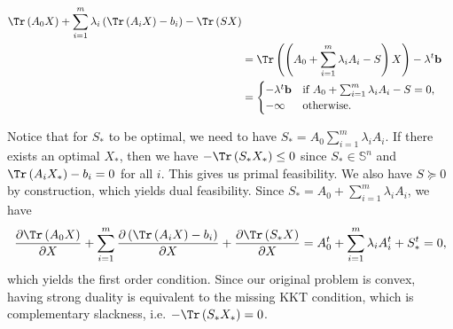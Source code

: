 \documentclass{article}
\begin{document}
\begin{itemize}
\begin{align*}
               \Tr\left(A_0X\right) +
               \sum_{i = 1}^{m}\lambda_{i}
               \left(\Tr\left(A_{i}X\right) - b_{i}\right) -
               \Tr\left(SX\right) \\
               &= \Tr\left(
               \left(
               A_0 + \sum_{i = 1}^{m} \lambda_{i}A_{i} -S
               \right)X
               \right)
               -\lambda^{t}\mathbf{b} \\
               &= 
               \begin{cases}
                   -\lambda^{t}\mathbf{b} &\text{if } 
                   A_0  + \sum_{i = 1}^{m}\lambda_{i}A_{i} - S = 0, \\
                   -\infty &\text{otherwise.}
               \end{cases}
           \end{align*}
           
           Notice that for $S_{*}$ to be optimal,
           we need to have $S_{*} = A_0 \sum_{i = 1}^{m} \lambda_{i}A_{i}$.
           If there exists an optimal $X_{*}$,
           then we have $-\Tr\left(S_{*}X_{*}\right) \leq 0$
           since $S_{*} \in \mathbb{S}^{n}$ and
           $\Tr\left(A_{i}X_{*}\right) - b_{i} = 0$
           for all $i$. This gives us primal feasibility.
           We also have $S \succeq 0$ by construction, which
           yields dual feasibility.
           Since $S_{*} = A_0 + \sum_{i = 1}^{m} \lambda_{i}A_{i}$,
           we have
           \begin{equation*}
               \frac{\partial \Tr\left(A_0X\right)}{\partial X} + 
               \sum_{i = 1}^{m} \frac{\partial \left(\Tr\left(A_{i}X\right) - b_{i}\right)}{\partial X} +
               \frac{\partial \Tr\left(S_{*}X\right)}{\partial X}
               = A_{0}^{t} + \sum_{i = 1}^{m}\lambda_{i} A_{i}^{t} + S_{*}^{t} = 0,
           \end{equation*}
           which yields the first order condition.
           Since our original problem is convex,
           having strong duality is equivalent
           to the missing KKT condition,
           which is complementary slackness,
           i.e. $-\Tr\left(S_{*}X_{*}\right) = 0$.
   \end{itemize}
   \begin{exo}          
   \end{exo}
\end{document}
